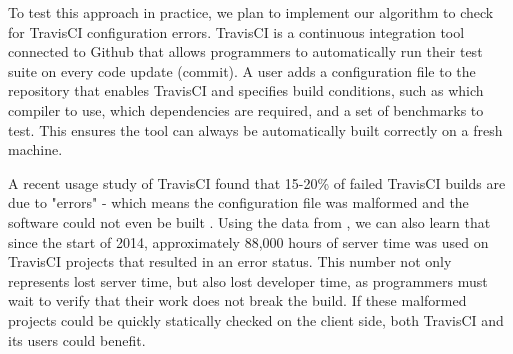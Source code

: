 To test this approach in practice, we plan to implement our algorithm to check for TravisCI configuration errors.
TravisCI is a continuous integration tool connected to Github that allows programmers to automatically run their test suite on every code update (commit).
A user adds a configuration file to the repository that enables TravisCI and specifies build conditions, such as which compiler to use, which dependencies are required, and a set of benchmarks to test.
This ensures the tool can always be automatically built correctly on a fresh machine.

A recent usage study of TravisCI found that 15-20\% of failed TravisCI builds are due to "errors" - which means the configuration file was malformed and the software could not even be built \cite{API}.
Using the data from \cite{API}, we can also learn that since the start of 2014, approximately 88,000 hours of server time was used on TravisCI projects that resulted in an error status.
This number not only represents lost server time, but also lost developer time, as programmers must wait to verify that their work does not break the build.
If these malformed projects could be quickly statically checked on the client side, both TravisCI and its users could benefit.
